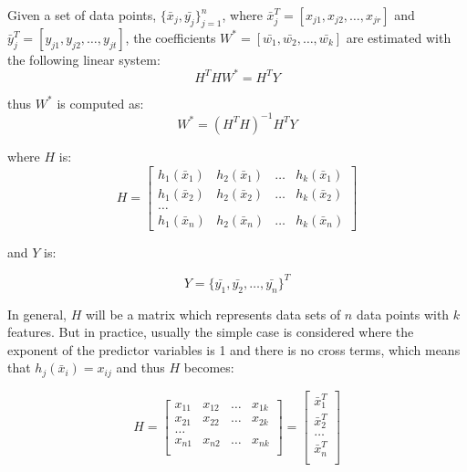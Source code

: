Given a set of data points, $\{\bar{x}_j,\bar{y_j}\}_{j=1}^n$, where $\bar{x}_j^T=[x_{j1},x_{j2}, \dots, x_{jr}]$ and $\bar{y}_j^T=[y_{j1},y_{j2}, \dots, y_{jt}]$, the coefficients $W^* = [\bar{w_1},\bar{w_2},\dots,\bar{w_k}]$ are estimated with the following linear system:
\begin{equation}\label{eq: regression_solve}
    H^THW^*=H^TY
\end{equation}

thus $W^*$ is computed as:
\begin{equation}\label{eq: regression_solve_final}
    W^*=(H^TH)^{-1}H^TY
\end{equation}



where $H$ is:
\begin{equation}
    H=\begin{bmatrix}
h_1(\bar{x}_1) & h_2(\bar{x}_1) &\dots &h_k(\bar{x}_1)\\
h_1(\bar{x}_2) & h_2(\bar{x}_2) &\dots &h_k(\bar{x}_2)\\
\dots\\
h_1(\bar{x}_n) & h_2(\bar{x}_n) &\dots &h_k(\bar{x}_n)
\end{bmatrix}
\end{equation}

and $Y$ is:

\begin{equation}
    Y = \{\bar{y_1}, \bar{y_2},\dots, \bar{y_n}\}^T
\end{equation}

In general, $H$ will be a matrix which represents data sets of $n$ data points with $k$ features. But in practice, usually the simple case is considered where the exponent of the predictor variables is 1 and there is no cross terms, which means that $h_j(\bar{x}_i) = x_{ij}$ and thus $H$ becomes:

\begin{equation}
    H=\begin{bmatrix}
x_{11} & x_{12} &\dots &x_{1k}\\
x_{21} & x_{22} &\dots &x_{2k}\\
\dots\\
x_{n1} & x_{n2} &\dots &x_{nk}\\
\end{bmatrix}
=\begin{bmatrix}
\bar{x}_1^T\\
\bar{x}_2^T\\
\dots\\
\bar{x}_n^T\\
\end{bmatrix}
\end{equation}

